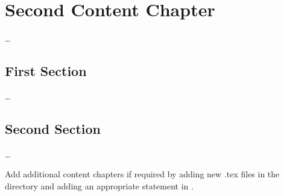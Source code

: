 \chapter{Second Content Chapter}
\label{ch:SecondContent}

\dots

\section{First Section}
\label{sec:SecondContent:FirstSection}

\dots

\section{Second Section}
\label{sec:SecondContent:SecondSection}

\dots

Add additional content chapters if required by adding new .tex files in the
 directory and adding an appropriate 
 statement in . 
\fi
